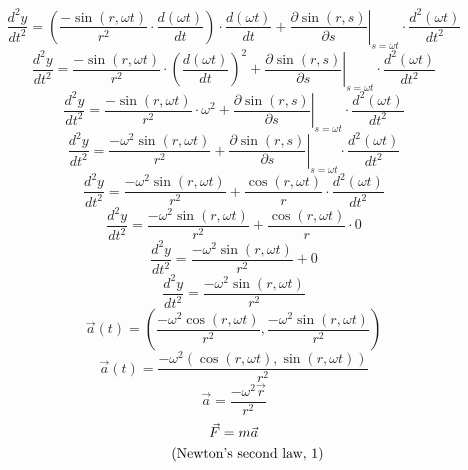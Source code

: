 \documentclass[a4paper,12pt]{report}
\newcommand{\equationnote}[1]{%
    \refstepcounter{equation}%
    \tag{#1, \theequation}%
}
\begin{document}
\begin{equation}
\frac{d^2y}{dt^2} = \left(\frac{-\sin(r,\omega t)}{r^2} \cdot \frac{d (\omega t)}{dt}\right) \cdot \frac{d (\omega t)}{dt} + \left.\frac{\partial \sin(r,s)}{\partial s}\right|_{s = \omega t} \cdot \frac{d^2 (\omega t)}{dt^2}
\end{equation}
\begin{equation}
\frac{d^2y}{dt^2} = \frac{-\sin(r,\omega t)}{r^2} \cdot \left(\frac{d (\omega t)}{dt}\right)^2 + \left.\frac{\partial \sin(r,s)}{\partial s}\right|_{s = \omega t} \cdot \frac{d^2 (\omega t)}{dt^2}
\end{equation}
\begin{equation}
\frac{d^2y}{dt^2} = \frac{-\sin(r,\omega t)}{r^2} \cdot \omega^2 + \left.\frac{\partial \sin(r,s)}{\partial s}\right|_{s = \omega t} \cdot \frac{d^2 (\omega t)}{dt^2}
\end{equation}
\begin{equation}
\frac{d^2y}{dt^2} = \frac{-\omega^2 \sin(r,\omega t)}{r^2} + \left.\frac{\partial \sin(r,s)}{\partial s}\right|_{s = \omega t} \cdot \frac{d^2 (\omega t)}{dt^2}
\end{equation}
\begin{equation}
\frac{d^2y}{dt^2} = \frac{-\omega^2 \sin(r,\omega t)}{r^2} + \frac{\cos(r,\omega t)}{r} \cdot \frac{d^2 (\omega t)}{dt^2}
\end{equation}
\begin{equation}
\frac{d^2y}{dt^2} = \frac{-\omega^2 \sin(r,\omega t)}{r^2} + \frac{\cos(r,\omega t)}{r} \cdot 0
\end{equation}
\begin{equation}
\frac{d^2y}{dt^2} = \frac{-\omega^2 \sin(r,\omega t)}{r^2} + 0
\end{equation}
\begin{equation}
\frac{d^2y}{dt^2} = \frac{-\omega^2 \sin(r,\omega t)}{r^2}
\end{equation}
\begin{equation}
\vec{a}(t) = \left(\frac{-\omega^2 \cos(r,\omega t)}{r^2},\frac{-\omega^2 \sin(r,\omega t)}{r^2}\right)
\end{equation}
\begin{equation}
\vec{a}(t) = \frac{-\omega^2 (\cos(r,\omega t),\sin(r,\omega t))}{r^2}
\end{equation}
\begin{equation}
\vec{a} = \frac{-\omega^2 \vec{r}}{r^2}
\end{equation}
\begin{gather}
\vec{F} = m \vec{a} \notag \\
\equationnote{Newton's second law}
\end{gather}
\end{document}
